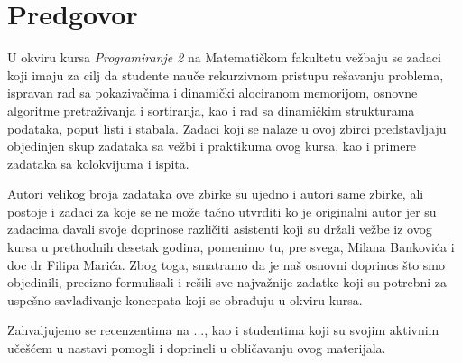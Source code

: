 
\chapter*{Predgovor}

U okviru kursa {\em Programiranje 2} na Matematičkom fakultetu vežbaju se zadaci koji imaju za cilj da studente nauče rekurzivnom pristupu rešavanju problema, ispravan rad sa pokazivačima i dinamički alociranom memorijom,  osnovne algoritme pretraživanja i sortiranja, kao i rad sa dinamičkim strukturama podataka, poput listi i stabala.  Zadaci koji se nalaze u ovoj zbirci predstavljaju objedinjen skup zadataka sa vežbi i praktikuma ovog kursa, kao i primere zadataka sa kolokvijuma i ispita. 

Autori velikog broja zadataka ove zbirke su ujedno i autori same zbirke, ali postoje i zadaci za koje se ne može tačno utvrditi ko je originalni autor jer su zadacima davali svoje doprinose različiti asistenti koji su držali vežbe iz ovog kursa u prethodnih desetak godina, pomenimo tu, pre svega, Milana Bankovića i doc dr Filipa Marića. Zbog toga, smatramo da je naš osnovni doprinos što smo objedinili, precizno formulisali i rešili sve najvažnije zadatke koji su potrebni za uspešno savlađivanje koncepata koji se obrađuju u okviru kursa. 

Zahvaljujemo se recenzentima na ..., kao i studentima koji su svojim aktivnim učešćem u nastavi pomogli i doprineli u obličavanju ovog materijala. 




\bigskip
